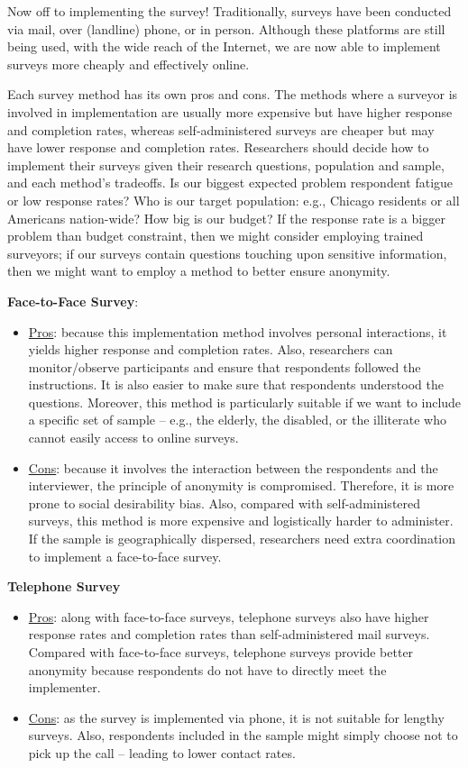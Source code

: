 \documentclass{book}
\begin{document}
Now off to implementing the survey! Traditionally, surveys have been conducted
via mail, over (landline) phone, or in person. Although these platforms are
still being used, with the wide reach of the Internet, we are now able to
implement surveys more cheaply and effectively online.

Each survey method has its own pros and cons. The methods where a surveyor is
involved in implementation are usually more expensive but have higher response
and completion rates, whereas self-administered surveys are cheaper but may
have lower response and completion rates. Researchers should decide how to
implement their surveys given their research questions, population and sample,
and each method's tradeoffs. Is our biggest expected problem respondent
fatigue or low response rates? Who is our target population: e.g., Chicago
residents or all Americans nation-wide? How big is our budget? If the response
rate is a bigger problem than budget constraint, then we might consider
employing trained surveyors; if our surveys contain questions touching upon
sensitive information, then we might want to employ a method to better ensure
anonymity.

\textbf{Face-to-Face Survey}:

\begin{itemize}
\item
  \uline{Pros}: because this implementation method involves personal
  interactions, it yields higher response and completion rates. Also,
  researchers can monitor/observe participants and ensure that respondents
  followed the instructions. It is also easier to make sure that respondents
  understood the questions. Moreover, this method is particularly suitable if
  we want to include a specific set of sample -- e.g., the elderly, the
  disabled, or the illiterate who cannot easily access to online surveys.
\item
  \uline{Cons}: because it involves the interaction between the respondents
  and the interviewer, the principle of anonymity is compromised. Therefore,
  it is more prone to social desirability bias. Also, compared with
  self-administered surveys, this method is more expensive and logistically
  harder to administer. If the sample is geographically dispersed, researchers
  need extra coordination to implement a face-to-face survey.
\end{itemize}

\textbf{Telephone Survey}

\begin{itemize}
\item
  \uline{Pros}: along with face-to-face surveys, telephone surveys also have
  higher response rates and completion rates than self-administered mail
  surveys. Compared with face-to-face surveys, telephone surveys provide
  better anonymity because respondents do not have to directly meet the
  implementer.
\item
  \uline{Cons}: as the survey is implemented via phone, it is not suitable for
  lengthy surveys. Also, respondents included in the sample might simply
  choose not to pick up the call -- leading to lower contact rates.
\end{itemize}
\end{document}
